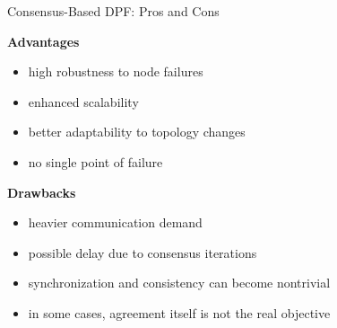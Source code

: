 \documentclass[aspectratio=169]{beamer}
\begin{document}

\begin{frame}{Consensus-Based DPF: Pros and Cons}

\textbf{Advantages}
\begin{itemize}
    \item high robustness to node failures
    \item enhanced scalability
    \item better adaptability to topology changes
    \item no single point of failure
\end{itemize}

\vspace{0.3cm}

\textbf{Drawbacks}
\begin{itemize}
    \item heavier communication demand
    \item possible delay due to consensus iterations
    \item synchronization and consistency can become nontrivial
    \item in some cases, agreement itself is not the real objective
\end{itemize}


\end{frame}





\end{document}
